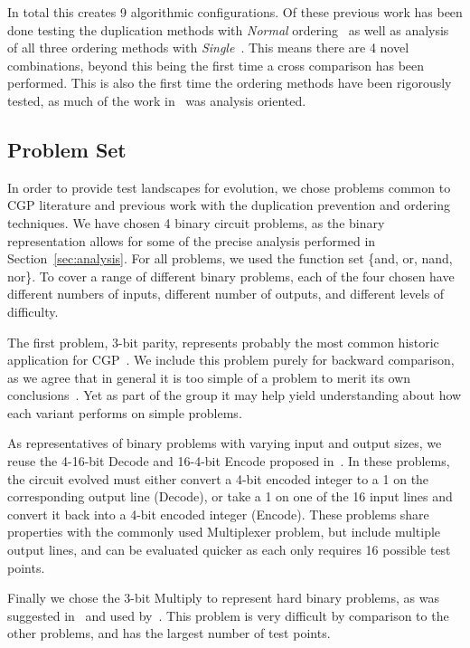 \documentclass[journal]{IEEEtran}
\begin{document}
In total this creates 9 algorithmic configurations.  Of these previous work
has been done testing the duplication methods with \emph{Normal} ordering~\cite{goldman:2013:cgpwaste}
as well as analysis of all three ordering methods with \emph{Single}~\cite{goldman:2013:ordering}.
This means there are 4 novel combinations, beyond this being the first time a cross
comparison has been performed.  This is also the first time the ordering methods
have been rigorously tested, as much of the work in~\cite{goldman:2013:ordering}
was analysis oriented.

\subsection{Problem Set}
In order to provide test landscapes for evolution, we chose problems common to
CGP literature and previous work with the duplication prevention and ordering
techniques.  We have chosen 4 binary circuit problems, as the binary representation
allows for some of the precise analysis performed in Section~\ref{sec:analysis}.
For all problems, we used the function set \{and, or, nand, nor\}.
To cover a range of different binary problems, each of the four chosen have
different numbers of inputs, different number of outputs, and different levels
of difficulty.

The first problem, 3-bit parity, represents probably the most
common historic application for
CGP~\cite{yu:2001:neutrality,miller:2006:redundancy,walker:2008:cgpmodules}.
We include this problem purely for backward comparison, as we agree that in general
it is too simple of a problem to merit its own conclusions~\cite{white:2013:bggb}.
Yet as part of the group it may help yield understanding about how each variant
performs on simple problems.

As representatives of binary problems with varying input and output sizes, we
reuse the 4-16-bit Decode and 16-4-bit Encode proposed in~\cite{goldman:2013:cgpwaste}.
In these problems, the circuit evolved must either convert a 4-bit encoded integer
to a 1 on the corresponding output line (Decode), or take a 1 on one of the 16
input lines and convert it back into a 4-bit encoded integer (Encode).  These
problems share properties with the commonly used Multiplexer problem, but include
multiple output lines, and can be evaluated quicker as each only requires 16 possible
test points.

Finally we chose the 3-bit Multiply to represent hard binary problems,
as was suggested in~\cite{white:2013:bggb} and used
by~\cite{vassilev:2000:neutrality,miller:2006:redundancy,walker:2008:cgpmodules}.
This problem is very difficult by comparison to the other problems, and has
the largest number of test points.
\end{document}
